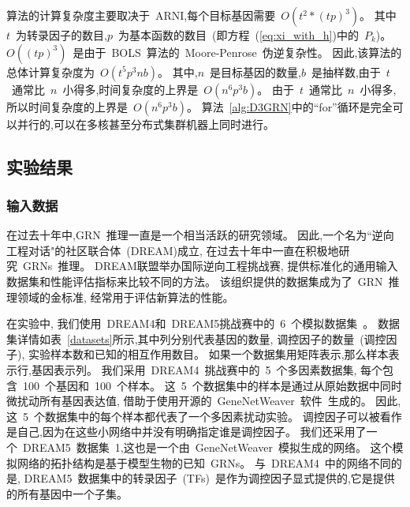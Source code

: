 算法的计算复杂度主要取决于~ARNI,每个目标基因需要~$O(t^2*(tp)^3)$。
其中~$t$~为转录因子的数目,$p$~为基本函数的数目~(即方程~(\ref{eq:xi_with_h})中的~$P_k$)。
$O((tp)^3)$~是由于~BOLS~算法的~Moore-Penrose~伪逆复杂性。
因此,该算法的总体计算复杂度为~$O(t^5p^3nb)$。
其中,$n$~是目标基因的数量,$b$~是抽样数,由于~$t$~通常比~$n$~小得多,时间复杂度的上界是~$O(n^6p^3b)$。
由于~$t$~通常比~$n$~小得多, 所以时间复杂度的上界是~$O(n^6p^3b)$。
算法~\ref{alg:D3GRN}中的``for''循环是完全可以并行的,可以在多核甚至分布式集群机器上同时进行。


\subsection{实验结果}
\subsubsection{输入数据}
在过去十年中,GRN~推理一直是一个相当活跃的研究领域。
因此,一个名为``逆向工程对话"的社区联合体~(DREAM)\cite{stolovitzky2007dialogue}成立,
在过去十年中一直在积极地研究~GRNs~推理。
DREAM联盟举办国际逆向工程挑战赛, 提供标准化的通用输入数据集和性能评估指标来比较不同的方法。
该组织提供的数据集成为了~GRN~推理领域的金标准, 经常用于评估新算法的性能。

在实验中,
我们使用~DREAM4和~DREAM5挑战赛中的~6~个模拟数据集~\cite{marbach2012wisdom}。
数据集详情如表~\ref{datasets}所示,其中列分别代表基因的数量,
调控因子的数量~(调控因子),
实验样本数和已知的相互作用数目。
如果一个数据集用矩阵表示,那么样本表示行,基因表示列。
我们采用~DREAM4~挑战赛中的~5~个多因素数据集,
每个包含~100~个基因和~100~个样本。
这~5~个数据集中的样本是通过从原始数据中同时微扰动所有基因表达值, 借助于使用开源的~GeneNetWeaver~软件~\cite{marbach2009generating}生成的。
因此,这~5~个数据集中的每个样本都代表了一个多因素扰动实验。
调控因子可以被看作是自己,因为在这些小网络中并没有明确指定谁是调控因子。
我们还采用了一个~DREAM5~数据集~1,这也是一个由~GeneNetWeaver~模拟生成的网络。
这个模拟网络的拓扑结构是基于模型生物的已知~GRNs。
与~DREAM4~中的网络不同的是,
DREAM5~数据集中的转录因子~(TFs)~是作为调控因子显式提供的,它是提供的所有基因中一个子集。



